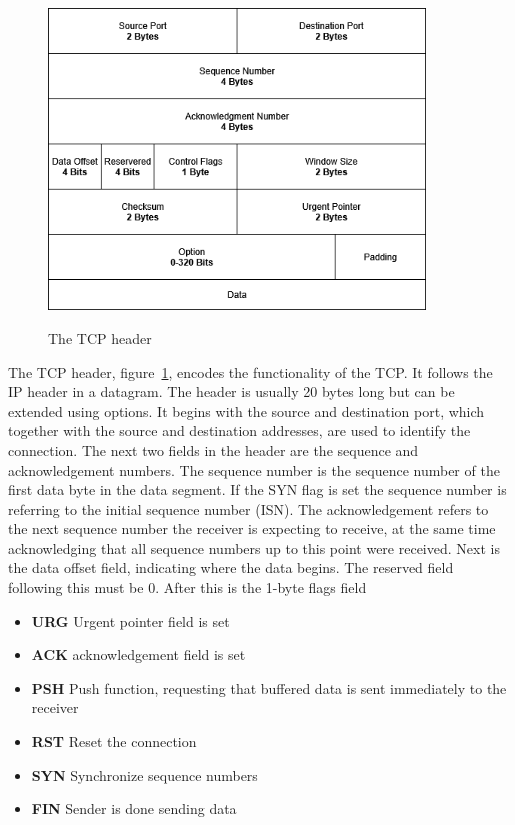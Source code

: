 \documentclass[english, 12pt, a4paper, elec, utf8, a-2b, online]{aaltothesis}
\begin{document}
\begin{figure}[t]
	\centering
	\includegraphics[alt={A block diagram of the TCP header format, detailing its fields and their sizes.}, height=8cm]{./images/tcp_header.png}
	\caption{The TCP header}
	\label{fig:tcp_header}
\end{figure}
The TCP header, figure~\ref{fig:tcp_header}, encodes the functionality of the TCP.
It follows the IP header in a datagram. The header is usually 20 bytes long but
can be extended using options. It begins with the source and destination port, which
together with the source and destination addresses, are used to identify the connection.
The next two fields in the header are the sequence and acknowledgement numbers. The
sequence number is the sequence number of the first data byte in the data segment.
If the SYN flag is set the sequence number is referring to the initial sequence number
(ISN). The acknowledgement refers to the next sequence number the receiver is
expecting to receive, at the same time acknowledging that all sequence numbers
up to this point were received. Next is the data offset field, indicating where
the data begins. The reserved field following this must be 0. After this is the
1-byte flags field
\begin{itemize}
	\item \textbf{URG} Urgent pointer field is set
	\item \textbf{ACK} acknowledgement field is set
	\item \textbf{PSH} Push function, requesting that buffered data is sent immediately to the receiver
	\item \textbf{RST} Reset the connection
	\item \textbf{SYN} Synchronize sequence numbers
	\item \textbf{FIN} Sender is done sending data
\end{itemize}
\end{document}
